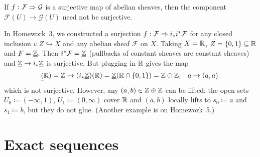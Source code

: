 
\begin{rmk}
If \(f\colon\mathcal F\To\mathcal G\) is a surjective map of abelian sheaves, then the component \(\mathcal F(U)\to\mathcal G(U)\) need not be surjective.

In Homework~3, we constructed a surjection \(f\colon\mathcal F\To i_*i^*\mathcal F\) for any closed inclusion \(i\colon Z\hookrightarrow X\) and any abelian sheaf \(\mathcal F\) on \(X\).
Taking \(X=\mathbb{R}\), \(Z = \{0,1\}\subseteq\mathbb{R}\) and \(F=\underline{\mathbb{Z}}\).
Then \(i^*\mathcal F = \underline{\mathbb{Z}}\) (pullbacks of constant sheaves are constant sheaves) and \(\underline{\mathbb{Z}}\to i_*\underline{\mathbb{Z}}\) is surjective.
But plugging in \(\mathbb{R}\) gives the map
\[\underline{(}\mathbb{R}) = \mathbb{Z} \to (i_*\underline{\mathbb{Z}})(\mathbb{R}) = \underline{\mathbb{Z}}(\mathbb{R}\cap\{0,1\}) = \mathbb{Z}\oplus\mathbb{Z}\text{,} \quad a \mapsto (a,a)\text{.} \]
which is not surjective.
However, any \((a,b)\in\mathbb{Z}\oplus\mathbb{Z}\) can be lifted: the open sets \(U_0\coloneq(-\infty,1)\), \(U_1\coloneq(0,\infty)\) cover \(\mathbb{R}\) and \((a,b)\) locally lifts to \(s_0\coloneq a\) and \(s_1\coloneq b\), but they do not glue.
(Another example is on Homework~5.)
\end{rmk}

\section{Exact sequences}

